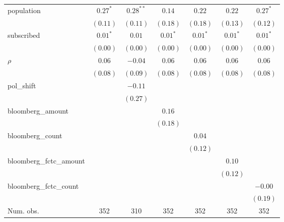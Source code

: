 \begin{table}[!h]
\begin{center}
\begin{tabular}{l c c c c c c }
population              & $0.27^{*}$   & $0.28^{**}$  & $0.14$       & $0.22$       & $0.22$       & $0.27^{*}$   \\
                        & $(0.11)$     & $(0.11)$     & $(0.18)$     & $(0.18)$     & $(0.13)$     & $(0.12)$     \\
subscribed              & $0.01^{*}$   & $0.01$       & $0.01^{*}$   & $0.01^{*}$   & $0.01^{*}$   & $0.01^{*}$   \\
                        & $(0.00)$     & $(0.00)$     & $(0.00)$     & $(0.00)$     & $(0.00)$     & $(0.00)$     \\
$\rho$                  & $0.06$       & $-0.04$      & $0.06$       & $0.06$       & $0.06$       & $0.06$       \\
                        & $(0.08)$     & $(0.09)$     & $(0.08)$     & $(0.08)$     & $(0.08)$     & $(0.08)$     \\
pol\_shift              &              & $-0.11$      &              &              &              &              \\
                        &              & $(0.27)$     &              &              &              &              \\
bloomberg\_amount       &              &              & $0.16$       &              &              &              \\
                        &              &              & $(0.18)$     &              &              &              \\
bloomberg\_count        &              &              &              & $0.04$       &              &              \\
                        &              &              &              & $(0.12)$     &              &              \\
bloomberg\_fctc\_amount &              &              &              &              & $0.10$       &              \\
                        &              &              &              &              & $(0.12)$     &              \\
bloomberg\_fctc\_count  &              &              &              &              &              & $-0.00$      \\
                        &              &              &              &              &              & $(0.19)$     \\
\midrule
Num. obs.               & 352          & 310          & 352          & 352          & 352          & 352          \\

\end{tabular}
\end{center}
\end{table}
